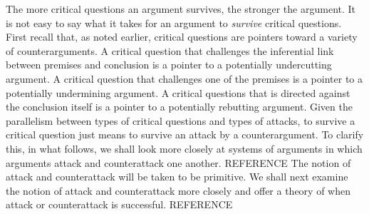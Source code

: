 \documentclass[10pt]{article}
\begin{document}
The more critical questions an argument survives, the stronger the argument. It is not easy to say what it takes for an argument to \textit{survive} critical questions. First recall that, as noted earlier, critical questions are pointers toward a variety of counterarguments. A critical question that challenges the inferential link between premises and conclusion is a pointer to a potentially undercutting argument. A critical question that challenges one of the premises is a pointer to a potentially undermining argument. A critical questions that is directed against the conclusion itself is a pointer to a potentially rebutting argument. Given the parallelism between types of critical questions and types of attacks, 
to survive a critical question just means to survive an attack by a counterargument. To clarify this, in what follows, we shall look more closely at systems of arguments in which arguments attack and counterattack one another. REFERENCE The notion of attack and counterattack 
will be taken to be primitive. We shall next examine the notion of attack and counterattack more closely and 
offer a theory of when attack or counterattack is successful. REFERENCE

\end{document}
